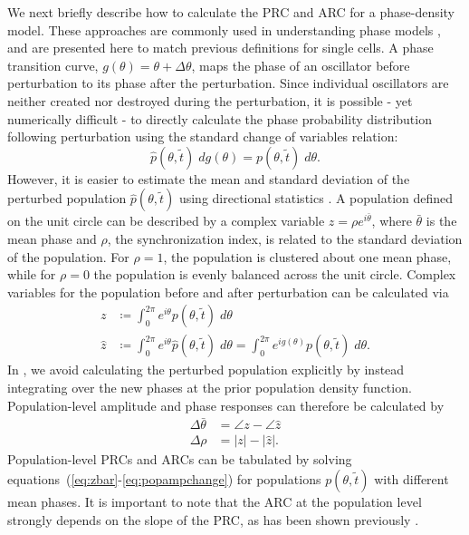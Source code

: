 We next briefly describe how to calculate the PRC and ARC for a phase-density model.
These approaches are commonly used in understanding phase models \cite{Kuramoto1984, Ukai2007}, and are presented here to match previous definitions for single cells.
A phase transition curve, $g(\theta) = \theta + \Delta\theta$, maps the phase of an oscillator before perturbation to its phase after the perturbation.
Since individual oscillators are neither created nor destroyed during the perturbation, it is possible - yet numerically difficult - to directly calculate the phase probability distribution following perturbation using the standard change of variables relation:
\begin{equation}
  \hat{p}(\theta, \tilde{t})\; dg(\theta) = p(\theta, \tilde{t})\; d\theta.
  \label{eq:pdfinversion}
\end{equation}
However, it is easier to estimate the mean and standard deviation of the perturbed population $\hat{p}(\theta, \tilde{t})$ using directional statistics \cite{Mardia2009}.
A population defined on the unit circle can be described by a complex variable $z = \rho e^{i\bar{\theta}}$, where $\bar{\theta}$ is the mean phase and $\rho$, the synchronization index, is related to the standard deviation of the population.
For $\rho = 1$, the population is clustered about one mean phase, while for $\rho = 0$ the population is evenly balanced across the unit circle.
Complex variables for the population before and after perturbation can be calculated via
\begin{align}
  z &\coloneqq \int_0^{2\pi} e^{i\theta} p(\theta, \tilde{t}) \; d\theta \label{eq:zbar}\\
  \hat{z} &\coloneqq  \int_0^{2\pi} e^{i\theta} \hat{p}(\theta, \tilde{t}) \; d\theta = \int_0^{2\pi} e^{i g(\theta)} p(\theta, \tilde{t}) \; d\theta.
  \label{eq:zhat}
\end{align}
In , we avoid calculating the perturbed population explicitly by instead integrating over the new phases at the prior population density function.
Population-level amplitude and phase responses can therefore be calculated by
\begin{align}
  \Delta \bar{\theta} &= \angle z - \angle \hat{z} \\
  \Delta \rho &= |z| - |\hat{z}|.
  \label{eq:popampchange}
\end{align}
Population-level PRCs and ARCs can be tabulated by solving equations~(\ref{eq:zbar}-\ref{eq:popampchange}) for populations $p(\theta, \tilde{t})$ with different mean phases.
It is important to note that the ARC at the population level strongly depends on the slope of the PRC, as has been shown previously \cite{Ukai2007}.


